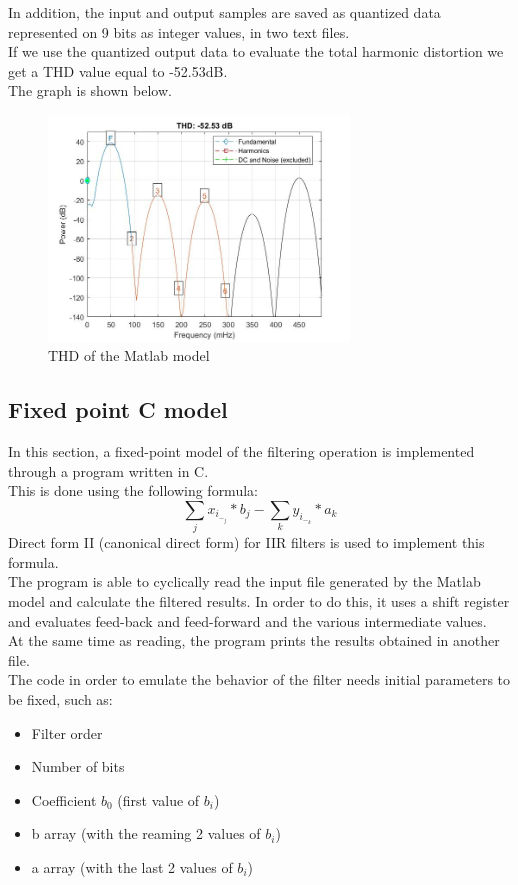 In addition, the input and output samples are saved as quantized data represented on 9 bits as integer values, in two text files.\\
If we use the quantized output data to evaluate the total harmonic distortion we get a THD value equal to -52.53dB.\\
The graph is shown below.\\

\begin{figure}[H]
	\centering
	\includegraphics[width=\textwidth, height=6cm]{img/thdm.jpg} 
	\caption{THD of the Matlab model}
	\label{fig:THD} 
\end{figure}

\subsection{Fixed point C model}
In this section, a fixed-point model of the filtering operation is implemented through a program written in C.\\
This is done using the following formula:\\
\[\sum_{j} x_i_-_j * b_j - \sum_{k} y_i_-_k * a_k\]
Direct form II (canonical direct form) for IIR filters is used to implement this formula.\\
The program is able to cyclically read the input file generated by the Matlab model and calculate the filtered results. In order to do this, it uses a shift register and evaluates feed-back and feed-forward and the various intermediate values.\\
At the same time as reading, the program prints the results obtained in another file.\\
The code in order to emulate the behavior of the filter needs initial parameters to be fixed, such as:
\begin{itemize}
    \item Filter order
    \item Number of bits
    \item Coefficient \(b_0\) (first value of \(b_i\))
    \item b array (with the reaming 2 values of \(b_i\))
    \item a array (with the last 2 values of \(b_i\))
\end{itemize}

